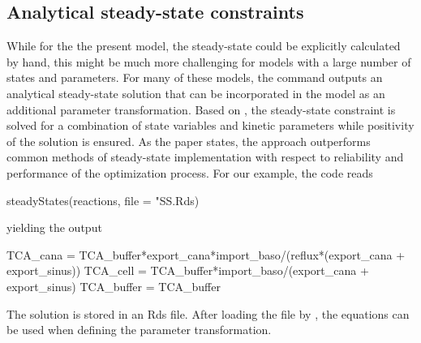 \documentclass[article]{jss}
\begin{document}

\subsection{Analytical steady-state constraints}
While for the the present model, the steady-state could be explicitly calculated by hand, this might be much more challenging for models with a large number of states and parameters. For many of these models, the  command outputs an analytical steady-state solution that can be incorporated in the model as an additional parameter transformation. Based on \citep{rosenblatt2016customized}, the steady-state constraint is solved for a combination of state variables and kinetic parameters while positivity of the solution is ensured. As the paper states, the approach outperforms common methods of steady-state implementation with respect to reliability and performance of the optimization process. For our example, the code reads
\begin{CodeChunk}
\begin{CodeInput}
steadyStates(reactions, file = "SS.Rds)
\end{CodeInput}
\end{CodeChunk}
yielding the output

\begin{CodeChunk}
\begin{CodeInput}
TCA_cana   = TCA_buffer*export_cana*import_baso/(reflux*(export_cana + 
	     export_sinus))
TCA_cell   = TCA_buffer*import_baso/(export_cana + export_sinus)
TCA_buffer = TCA_buffer
\end{CodeInput}
\end{CodeChunk}

The solution is stored in an Rds file. After loading the file by , the equations can be used when defining the parameter transformation.



{}
\end{document}
